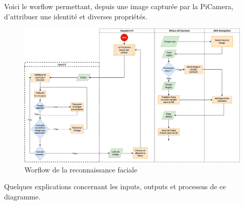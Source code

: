Voici le worflow permettant, depuis une image capturée par la PiCamera, d'attribuer une identité et diverses propriétés.

\clearpage
\newpage

\thispagestyle{empty}
\begin{landscape}
    \centering
\thispagestyle{empty}
\begin{figure}%
     \includegraphics[width=\linewidth]{images/facial_reco/facial_recognition_flow_v2.png}
     \caption{Worflow de la reconnaissance faciale}
     \label{fig:worflow-reco}
\end{figure}
\end{landscape}

Quelques explications concernant les inputs, outputs et processus de ce diagramme.

